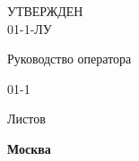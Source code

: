 
\begin{flushleft}
\begin{varwidth}{\linewidth}\centering
	\large
	УТВЕРЖДЕН \\
	{\docId} 01-1-ЛУ
\end{varwidth}
\end{flushleft}

\vskip4cm

{\Large\uppercase{\docTitle}}

\vskip1cm

{\large
	Руководство оператора

	{\docId} 01-1
}

\vskip1cm

Листов \pageref*{LastPage}

\vfill
\textbf{Москва \YEAR}